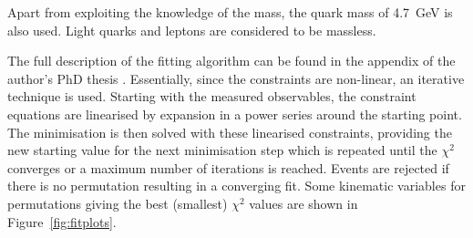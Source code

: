Apart from exploiting the knowledge of the \W mass, the \cPqb quark mass of \SI{4.7}{\GeV} is also used. Light quarks
and leptons are considered to be massless.

The full description of the fitting algorithm can be found in the appendix of the \HitFit author's PhD thesis
\autocite{Snyder}. Essentially, since the constraints are non-linear, an iterative technique is used. Starting with the
measured observables, the constraint equations are linearised by expansion in a power series around the starting point.
The minimisation is then solved with these linearised constraints, providing the new starting value for the next
minimisation step which is repeated until the $\chi^2$ converges or a maximum number of iterations is reached. Events
are rejected if there is no permutation resulting in a converging fit. Some kinematic variables for permutations giving
the best (smallest) $\chi^2$ values are shown in Figure~\ref{fig:fitplots}.

